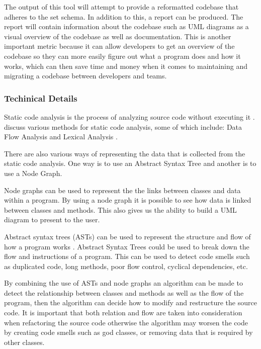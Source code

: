 \documentclass{article} %
\begin{document}
The output of this tool will attempt to provide a reformatted codebase that adheres to the set schema. In addition to this, a report can be produced. The report will contain information about the codebase such as UML diagrams as a visual overview of the codebase as well as documentation. This is another important metric because it can allow developers to get an overview of the codebase so they can more easily figure out what a program does and how it works, which can then save time and money when it comes to maintaining and migrating a codebase between developers and teams.

\subsubsection{Techinical Details}
Static code analysis is the process of analyzing source code without executing it \citep{8802820}. \cite{owasp/StaticCodeAnalysis} discuss various methods for static code analysis, some of which include: Data Flow Analysis \citep{owasp/StaticCodeAnalysis} and Lexical Analysis \citep{owasp/StaticCodeAnalysis}.

There are also various ways of representing the data that is collected from the static code analysis. One way is to use an Abstract Syntax Tree \citep{8802820} and another is to use a Node Graph.

Node graphs can be used to represent the the links between classes and data within a program. By using a node graph it is possible to see how data is linked between classes and methods. This also gives us the ability to build a UML diagram to present to the user.

Abstract syntax trees (ASTs) can be used to represent the structure and flow of how a program works \citep{8802820}. Abstract Syntax Trees could be used to break down the flow and instructions of a program. This can be used to detect code smells such as duplicated code, long methods, poor flow control, cyclical dependencies, etc.

By combining the use of ASTs and node graphs an algorithm can be made to detect the relationship between classes and methods as well as the flow of the program, then the algorithm can decide how to modify and restructure the source code. It is important that both relation and flow are taken into consideration when refactoring the source code otherwise the algorithm may worsen the code by creating code smells such as god classes, or removing data that is required by other classes.
\end{document}
